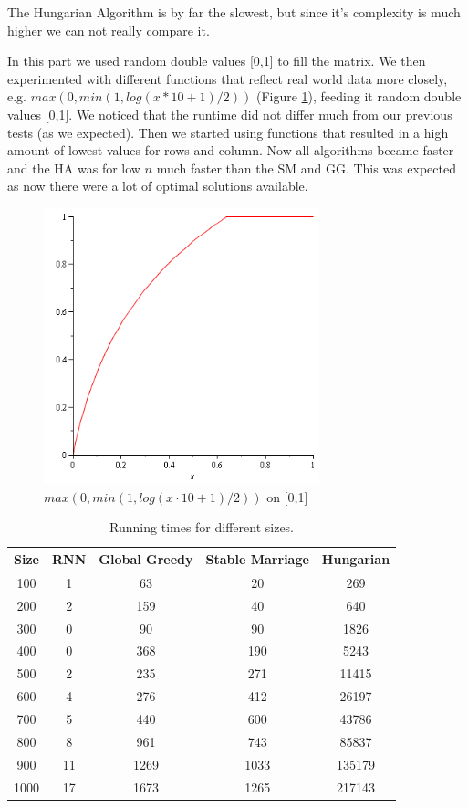 \documentclass[a4paper,11pt]{article}
\begin{document}
The Hungarian Algorithm is by far the slowest, but since it's complexity is much higher we can not really compare it.

In this part we used random double values [0,1] to fill the matrix. We then experimented with different functions that reflect real world data more closely, e.g. $max(0,min(1,log(x*10 + 1)/2))$ (Figure \ref{logfill}), feeding it random double values [0,1]. We noticed that the runtime did not differ much from our previous tests (as we expected). Then we started using functions that resulted in a high amount of lowest values for rows and column. Now all algorithms became faster and the HA was for low $n$ much faster than the SM and GG. This was expected as now there were a lot of optimal solutions available.

\begin{figure}[ht!]
\centering 
\includegraphics[width=80mm]{logfunction.png}
\caption{$max(0,min(1,log(x \cdot 10 + 1)/2))$ on [0,1]}
\label{logfill} 
\end{figure}

\begin{table}[tbh]
\centering
\begin{tabular}{|c|c|c|c|c|}
\hline 
Size & RNN & Global Greedy & Stable Marriage & Hungarian \tabularnewline
\hline 
\hline 
 100 & 1 & 63 & 20 & 269\tabularnewline
\hline
 200 & 2 & 159 & 40 & 640\tabularnewline
\hline 
 300 & 0 & 90 & 90 & 1826\tabularnewline
\hline 
 400 & 0 & 368 & 190 & 5243\tabularnewline
\hline 
 500 & 2 & 235 & 271 & 11415\tabularnewline
\hline 
 600 & 4 & 276 & 412 & 26197\tabularnewline
\hline 
 700 & 5 & 440 & 600 & 43786\tabularnewline
\hline
 800 & 8 & 961 & 743 & 85837\tabularnewline
\hline 
 900 & 11 & 1269 & 1033 & 135179\tabularnewline
\hline
 1000 & 17 & 1673 & 1265 & 217143\tabularnewline
\hline 
\end{tabular}
\caption{Running times for different sizes.}
\label{runtimes}
\end{table}
\end{document}
